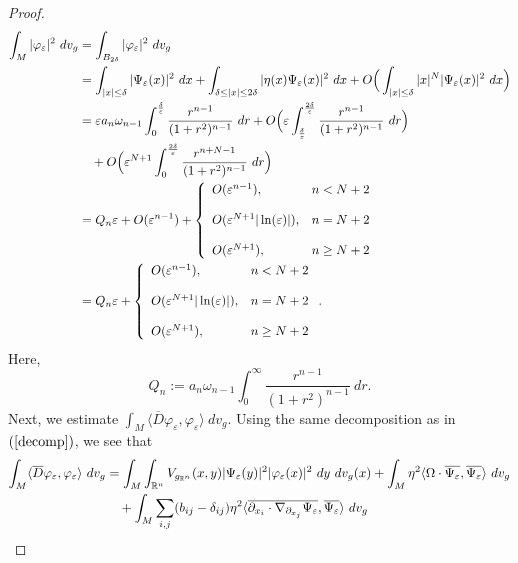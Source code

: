\documentclass[11pt]{article}
\def \R {\mathbb{R}}
\begin{document}
{\begin{proof}
\begin{align}
\int_{M}|\varphi_{\varepsilon}|^{2}\ dv_{g}&= \int_{B_{2\delta}}|\varphi_{\varepsilon}|^{2}\ dv_{g}\notag\\
&=\int_{|x|\leq \delta}|\Psi_{\varepsilon}(x)|^{2}\ dx + \int_{\delta\leq |x|\leq 2\delta}|\eta(x)\Psi_{\varepsilon}(x)|^{2}\ dx +O\Big( \int_{|x|\leq \delta}|x|^{N}|\Psi_{\varepsilon}(x)|^{2}\ dx\Big)\notag\\
&=\varepsilon a_{n}\omega_{n-1}\int_{0}^{\frac{\delta}{\varepsilon}}\frac{r^{n-1}}{(1+r^{2})^{n-1}}\ dr +O\Big(\varepsilon \int_{\frac{\delta}{\varepsilon}}^{\frac{2\delta}{\varepsilon}}\frac{r^{n-1}}{(1+r^{2})^{n-1}}\ dr\Big)\notag\\
&\quad+O\Big(\varepsilon^{N+1}\int_{0}^{\frac{2\delta}{\varepsilon}} \frac{r^{n+N-1}}{(1+r^{2})^{n-1}}\ dr \Big)\notag\\
&=Q_{n}\varepsilon+O(\varepsilon^{n-1})+ \left\{\begin{array}{ll}
O(\varepsilon^{n-1}), & n< N+2\\
\\
O(\varepsilon^{N+1}|\ln(\varepsilon)|), & n=N+2\\
\\
O(\varepsilon^{N+1}), & n\geq N+2
\end{array}
\right.\notag\\
&=Q_{n}\varepsilon+ \left\{\begin{array}{ll}
O(\varepsilon^{n-1}), & n<N+2\\
\\
O(\varepsilon^{N+1}|\ln(\varepsilon)|), & n=N+2\\
\\
O(\varepsilon^{N+1}), & n\geq N+2
\end{array}
\right..\label{L2norm}
\end{align}
Here, $$Q_{n}:=a_{n} \omega_{n-1}\int_{0}^{\infty} \frac{r^{n-1}}{(1+r^{2})^{n-1}}\ dr.$$
Next, we estimate $\int_{M}\langle \overline{D} \varphi_{\varepsilon},\varphi_{\varepsilon}\rangle \ dv_{g}$. Using the same decomposition as in $(\ref{decomp})$, we see that
\begin{align}
\int_{M}\langle \overline{D} \varphi_{\varepsilon},\varphi_{\varepsilon}\rangle \ dv_{g}&= \int_{M}\int_{\R^{n}}V_{g_{\R^{n}}}(x,y)|\Psi_{\varepsilon}(y)|^{2} |\varphi_{\varepsilon}(x)|^{2} \ dy \ dv_{g}(x)+\int_{M}\eta^{2} \langle \Omega\cdot \overline{\Psi_{\varepsilon}},\overline{\Psi_{\varepsilon}}\rangle \ dv_{g}\notag\\
&\quad + \int_{M}\sum_{i,j}(b_{ij}-\delta_{ij}) \eta^{2} \langle \overline{\partial_{x_{i}}\cdot \nabla_{\partial_{x_{j}}}\Psi_{\varepsilon}}, \overline{\Psi_{\varepsilon}}\rangle \ dv_{g}\notag\\

\end{align}
\end{proof}}
\end{document}
